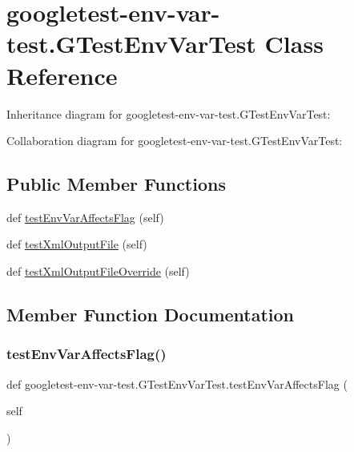 \hypertarget{classgoogletest-env-var-test_1_1GTestEnvVarTest}{}\section{googletest-\/env-\/var-\/test.G\+Test\+Env\+Var\+Test Class Reference}
\label{classgoogletest-env-var-test_1_1GTestEnvVarTest}


Inheritance diagram for googletest-\/env-\/var-\/test.G\+Test\+Env\+Var\+Test\+:


Collaboration diagram for googletest-\/env-\/var-\/test.G\+Test\+Env\+Var\+Test\+:
\subsection*{Public Member Functions}
\begin{DoxyCompactItemize}
\item 
def \hyperlink{classgoogletest-env-var-test_1_1GTestEnvVarTest_ae0165e3c30ce525c4d2f653e8f27ed3c}{test\+Env\+Var\+Affects\+Flag} (self)
\item 
def \hyperlink{classgoogletest-env-var-test_1_1GTestEnvVarTest_a6929a9194cdf872c02f6b2f3de9ff499}{test\+Xml\+Output\+File} (self)
\item 
def \hyperlink{classgoogletest-env-var-test_1_1GTestEnvVarTest_acf4114bec10759f9545f16846ce17f6f}{test\+Xml\+Output\+File\+Override} (self)
\end{DoxyCompactItemize}


\subsection{Member Function Documentation}
\mbox{\label{classgoogletest-env-var-test_1_1GTestEnvVarTest_ae0165e3c30ce525c4d2f653e8f27ed3c}} 
\subsubsection{\texorpdfstring{test\+Env\+Var\+Affects\+Flag()}{testEnvVarAffectsFlag()}}
{\footnotesize\ttfamily def googletest-\/env-\/var-\/test.\+G\+Test\+Env\+Var\+Test.\+test\+Env\+Var\+Affects\+Flag (\begin{DoxyParamCaption}\item[{}]{self }\end{DoxyParamCaption})}

